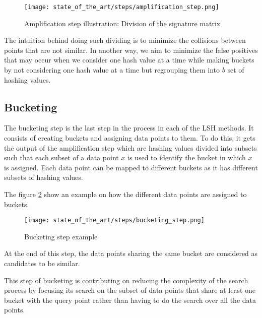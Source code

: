 \begin{figure}[h]
    \centering
    \texttt{[image: state\_of\_the\_art/steps/amplification\_step.png]}
    \caption{Amplification step illustration: Division of the signature matrix}
    \label{fig:amplification_divide_rb}
\end{figure}

The intuition behind doing such dividing is to minimize the collisions between
points that are not similar. In another way, we aim to minimize the false
positives that may occur when we consider one hash value at a time while making
buckets by not considering one hash value at a time but regrouping them into $b$
set of hashing values.

\subsection{Bucketing}
The bucketing step is the last step in the process in each of the LSH methods.
It consists of creating buckets and assigning data points to them. To do this,
it gets the output of the amplification step which are hashing values divided
into subsets such that each subset of a data point $x$ is used to identify the
bucket in which $x$ is assigned. Each data point can be mapped to different
buckets as it has different subsets of hashing values.

The figure \ref{fig:bucketing_example} show an example on how the different data
points are assigned to buckets.

\begin{figure}[h]
    \centering
    \texttt{[image: state\_of\_the\_art/steps/bucketing\_step.png]}
    \caption{Bucketing step example}
    \label{fig:bucketing_example}
\end{figure}

At the end of this step, the data points sharing the same bucket are considered
as candidates to be similar.

This step of bucketing is contributing on reducing the complexity of the search
process by focusing its search on the subset of data points that share at least
one bucket with the query point rather than having to do the search over all the
data points.
